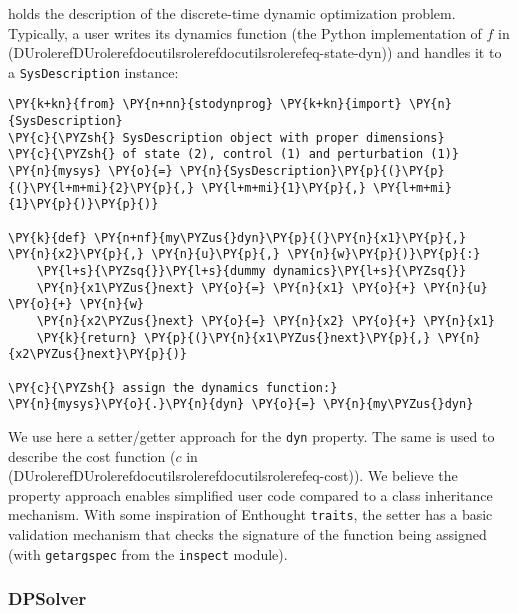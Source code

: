 \documentclass[letterpaper,compsoc,twoside]{IEEEtran}
\makeatletter
\def\PY@reset{\let\PY@it=\relax \let\PY@bf=\relax \let\PY@ul=\relax \let\PY@tc=\relax \let\PY@bc=\relax \let\PY@ff=\relax}
\def\PY@tok#1{\csname PY@tok@#1\endcsname}
\def\PY@toks#1+{\ifx\relax#1\empty\else \PY@tok{#1}\expandafter\PY@toks\fi}
\def\PY@do#1{\PY@bc{\PY@tc{\PY@ul{\PY@it{\PY@bf{\PY@ff{#1}}}}}}}
\def\PY#1#2{\PY@reset\PY@toks#1+\relax+\PY@do{#2}}
\def\PYZus{\char`\_}
\def\PYZsh{\char`\#}
\def\PYZsq{\char`\'}
\providecommand*{\DUrole}[2]{\ifcsname DUrole#1\endcsname \csname DUrole#1\endcsname{#2}\else \ifcsname docutilsrole#1\endcsname \csname docutilsrole#1\endcsname{#2}\else #2\fi \fi }
\makeatother
\begin{document}
holds the description of the discrete-time dynamic optimization problem.
Typically, a user writes its dynamics function (the Python
implementation of $f$ in (\DUrole{ref}{eq-state-dyn}))
and handles it to a \texttt{SysDescription} instance:\begin{Verbatim}[commandchars=\\\{\},fontsize=\footnotesize]
\PY{k+kn}{from} \PY{n+nn}{stodynprog} \PY{k+kn}{import} \PY{n}{SysDescription}
\PY{c}{\PYZsh{} SysDescription object with proper dimensions}
\PY{c}{\PYZsh{} of state (2), control (1) and perturbation (1)}
\PY{n}{mysys} \PY{o}{=} \PY{n}{SysDescription}\PY{p}{(}\PY{p}{(}\PY{l+m+mi}{2}\PY{p}{,} \PY{l+m+mi}{1}\PY{p}{,} \PY{l+m+mi}{1}\PY{p}{)}\PY{p}{)}

\PY{k}{def} \PY{n+nf}{my\PYZus{}dyn}\PY{p}{(}\PY{n}{x1}\PY{p}{,} \PY{n}{x2}\PY{p}{,} \PY{n}{u}\PY{p}{,} \PY{n}{w}\PY{p}{)}\PY{p}{:}
    \PY{l+s}{\PYZsq{}}\PY{l+s}{dummy dynamics}\PY{l+s}{\PYZsq{}}
    \PY{n}{x1\PYZus{}next} \PY{o}{=} \PY{n}{x1} \PY{o}{+} \PY{n}{u} \PY{o}{+} \PY{n}{w}
    \PY{n}{x2\PYZus{}next} \PY{o}{=} \PY{n}{x2} \PY{o}{+} \PY{n}{x1}
    \PY{k}{return} \PY{p}{(}\PY{n}{x1\PYZus{}next}\PY{p}{,} \PY{n}{x2\PYZus{}next}\PY{p}{)}

\PY{c}{\PYZsh{} assign the dynamics function:}
\PY{n}{mysys}\PY{o}{.}\PY{n}{dyn} \PY{o}{=} \PY{n}{my\PYZus{}dyn}
\end{Verbatim}
We use here a setter/getter approach for the \texttt{dyn} property. The same
is used to describe the cost function ($c$ in (\DUrole{ref}{eq-cost})).
We believe the
property approach enables simplified user code compared to a class
inheritance mechanism. With some inspiration of Enthought \texttt{traits},
the setter has a basic validation mechanism that checks the signature of
the function being assigned (with \texttt{getargspec} from the \texttt{inspect}
module).

\subsubsection{DPSolver\label{dpsolver}}
\end{document}
